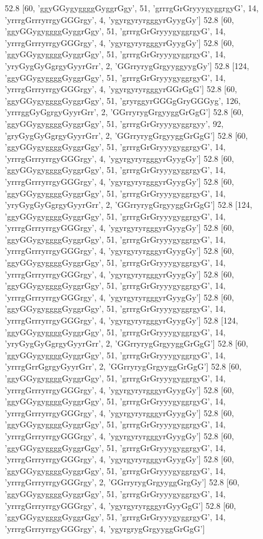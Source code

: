 52.8 [60, 'ggyGGygyggggGyggrGgy', 51, 'grrrgGrGryyygyggrgyG', 14, 'yrrrgGrrryrrgyGGGrgy', 4, 'ygyrgyryrgggyrGyygGy']
52.8 [60, 'ggyGGygyggggGyggrGgy', 51, 'grrrgGrGryyygyggrgyG', 14, 'yrrrgGrrryrrgyGGGrgy', 4, 'ygyrgyryrgggyrGyygGy']
52.8 [60, 'ggyGGygyggggGyggrGgy', 51, 'grrrgGrGryyygyggrgyG', 14, 'yryGygGyGgrgyGyyrGrr', 2, 'GGrryrygGrgyyggyygGy']
52.8 [124, 'ggyGGygyggggGyggrGgy', 51, 'grrrgGrGryyygyggrgyG', 14, 'yrrrgGrrryrrgyGGGrgy', 4, 'ygyrgyryrgggyrGGrGgG']
52.8 [60, 'ggyGGygyggggGyggrGgy', 51, 'gryrggyrGGGgGryGGGyg', 126, 'yrrrggGyGgrgyGyyrGrr', 2, 'GGrryrygGrgyyggGrGgG']
52.8 [60, 'ggyGGygyggggGyggrGgy', 51, 'grrrgGrGryyygyggrgyy', 92, 'gryGygGyGgrgyGyyrGrr', 2, 'GGrryrygGrgyyggGrGgG']
52.8 [60, 'ggyGGygyggggGyggrGgy', 51, 'grrrgGrGryyygyggrgyG', 14, 'yrrrgGrrryrrgyGGGrgy', 4, 'ygyrgyryrgggyrGyygGy']
52.8 [60, 'ggyGGygyggggGyggrGgy', 51, 'grrrgGrGryyygyggrgyG', 14, 'yrrrgGrrryrrgyGGGrgy', 4, 'ygyrgyryrgggyrGyygGy']
52.8 [60, 'ggyGGygyggggGyggrGgy', 51, 'grrrgGrGryyygyggrgyG', 14, 'yryGygGyGgrgyGyyrGrr', 2, 'GGrryrygGrgyyggGrGgG']
52.8 [124, 'ggyGGygyggggGyggrGgy', 51, 'grrrgGrGryyygyggrgyG', 14, 'yrrrgGrrryrrgyGGGrgy', 4, 'ygyrgyryrgggyrGyygGy']
52.8 [60, 'ggyGGygyggggGyggrGgy', 51, 'grrrgGrGryyygyggrgyG', 14, 'yrrrgGrrryrrgyGGGrgy', 4, 'ygyrgyryrgggyrGyygGy']
52.8 [60, 'ggyGGygyggggGyggrGgy', 51, 'grrrgGrGryyygyggrgyG', 14, 'yrrrgGrrryrrgyGGGrgy', 4, 'ygyrgyryrgggyrGyygGy']
52.8 [60, 'ggyGGygyggggGyggrGgy', 51, 'grrrgGrGryyygyggrgyG', 14, 'yrrrgGrrryrrgyGGGrgy', 4, 'ygyrgyryrgggyrGyygGy']
52.8 [60, 'ggyGGygyggggGyggrGgy', 51, 'grrrgGrGryyygyggrgyG', 14, 'yrrrgGrrryrrgyGGGrgy', 4, 'ygyrgyryrgggyrGyygGy']
52.8 [124, 'ggyGGygyggggGyggrGgy', 51, 'grrrgGrGryyygyggrgyG', 14, 'yryGygGyGgrgyGyyrGrr', 2, 'GGrryrygGrgyyggGrGgG']
52.8 [60, 'ggyGGygyggggGyggrGgy', 51, 'grrrgGrGryyygyggrgyG', 14, 'yrrrgGrrGgrgyGyyrGrr', 2, 'GGrryrygGrgyyggGrGgG']
52.8 [60, 'ggyGGygyggggGyggrGgy', 51, 'grrrgGrGryyygyggrgyG', 14, 'yrrrgGrrryrrgyGGGrgy', 4, 'ygyrgyryrgggyrGyygGy']
52.8 [60, 'ggyGGygyggggGyggrGgy', 51, 'grrrgGrGryyygyggrgyG', 14, 'yrrrgGrrryrrgyGGGrgy', 4, 'ygyrgyryrgggyrGyygGy']
52.8 [60, 'ggyGGygyggggGyggrGgy', 51, 'grrrgGrGryyygyggrgyG', 14, 'yrrrgGrrryrrgyGGGrgy', 4, 'ygyrgyryrgggyrGyygGy']
52.8 [60, 'ggyGGygyggggGyggrGgy', 51, 'grrrgGrGryyygyggrgyG', 14, 'yrrrgGrrryrrgyGGGrgy', 4, 'ygyrgyryrgggyrGyygGy']
52.8 [60, 'ggyGGygyggggGyggrGgy', 51, 'grrrgGrGryyygyggrgyG', 14, 'yrrrgGrrryrrgyGGGrgy', 2, 'GGrryrygGrgyyggGrgGy']
52.8 [60, 'ggyGGygyggggGyggrGgy', 51, 'grrrgGrGryyygyggrgyG', 14, 'yrrrgGrrryrrgyGGGrgy', 4, 'ygyrgyryrgggyrGyyGgG']
52.8 [60, 'ggyGGygyggggGyggrGgy', 51, 'grrrgGrGryyygyggrgyG', 14, 'yrrrgGrrryrrgyGGGrgy', 4, 'ygyrgrygGrgyyggGrGgG']

